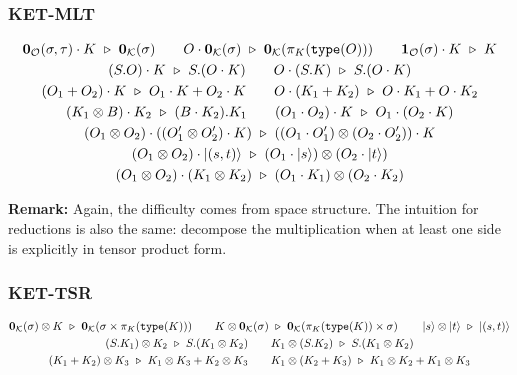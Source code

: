 \documentclass[manuscript, review, timestamp]{acmart}
\newcommand*{\type}{\texttt{type}}
\newcommand*{\reduce}{\ \triangleright\ }
\begin{document}
\subsubsection*{\textsf{KET-MLT}}
\begin{gather}
  \textbf{0}_\mathcal{O}(\sigma, \tau) \cdot K \reduce \textbf{0}_\mathcal{K}(\sigma)
  \qquad
  O \cdot \mathbf{0}_{\mathcal{K}}(\sigma) \reduce \mathbf{0}_{\mathcal{K}}(\pi_K(\type(O)))
  \qquad
  \textbf{1}_\mathcal{O}(\sigma) \cdot K \reduce K \notag \\
  (S.O) \cdot K \reduce S.(O \cdot K)
  \qquad
  O \cdot (S.K) \reduce S.(O \cdot K) \notag \\
  (O_1 + O_2) \cdot K \reduce O_1 \cdot K + O_2 \cdot K
  \qquad
  O \cdot (K_1 + K_2) \reduce O \cdot K_1 + O \cdot K_2 \notag \\
  (K_1 \otimes B) \cdot K_2 \reduce (B \cdot K_2).K_1
  \qquad
  (O_1 \cdot O_2) \cdot K \reduce O_1 \cdot (O_2 \cdot K) \label{rule: ketbradiff1} \\
  (O_1 \otimes O_2) \cdot ((O_1' \otimes O_2') \cdot K) \reduce ((O_1 \cdot O_1') \otimes (O_2 \cdot O_2')) \cdot K \label{rule: ketbradiff2} \\
  (O_1 \otimes O_2) \cdot \ket{(s, t)} \reduce (O_1 \cdot \ket{s}) \otimes (O_2 \cdot \ket{t}) \notag \\
  (O_1 \otimes O_2) \cdot (K_1 \otimes K_2) \reduce (O_1 \cdot K_1) \otimes (O_2 \cdot K_2) \notag
\end{gather}

\textbf{Remark:} Again, the difficulty comes from space structure. The intuition for reductions is also the same: decompose the multiplication when at least one side is explicitly in tensor product form.


\subsubsection*{\textsf{KET-TSR}}
\begin{gather*}
  \mathbf{0}_\mathcal{K}(\sigma) \otimes K \reduce \mathbf{0}_\mathcal{K}(\sigma \times \pi_K(\type(K)))
  \qquad
  K \otimes \mathbf{0}_\mathcal{K}(\sigma) \reduce \mathbf{0}_\mathcal{K}(\pi_K(\type(K)) \times \sigma)
  \qquad
  \ket{s} \otimes \ket{t}\reduce\ket{(s, t)} \\
  (S.K_1) \otimes K_2 \reduce S.(K_1 \otimes K_2)
  \qquad
  K_1 \otimes (S.K_2) \reduce S.(K_1 \otimes K_2) \\
  (K_1 + K_2) \otimes K_3 \reduce K_1 \otimes K_3 + K_2 \otimes K_3
  \qquad
  K_1 \otimes (K_2 + K_3) \reduce K_1 \otimes K_2 + K_1 \otimes K_3
\end{gather*}
\end{document}
